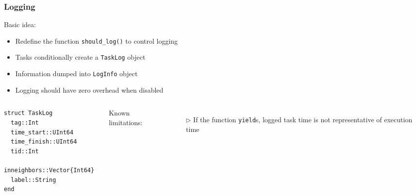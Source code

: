 \documentclass{beamer}
\begin{document}
\begin{frame}[fragile]
\frametitle{Logging}

Basic idea:
\begin{itemize}
  \item Redefine the function
  \texttt{should_log()} to control logging
  \item Tasks conditionally create a \texttt{TaskLog} object
  \item Information dumped into \texttt{LogInfo} object
  \item Logging should have zero overhead when disabled
\end{itemize}

\hrulefill

\begin{columns}


\begin{verbatim}
struct TaskLog
  tag::Int
  time_start::UInt64
  time_finish::UInt64
  tid::Int
  inneighbors::Vector{Int64}
  label::String
end
\end{verbatim}


Known limitations:
\begin{itemize}
  \item[$\triangleright$] If the function \texttt{yield}s, logged task time is
  not representative of execution time
\end{itemize}

\end{columns}

\end{frame}
\end{document}
